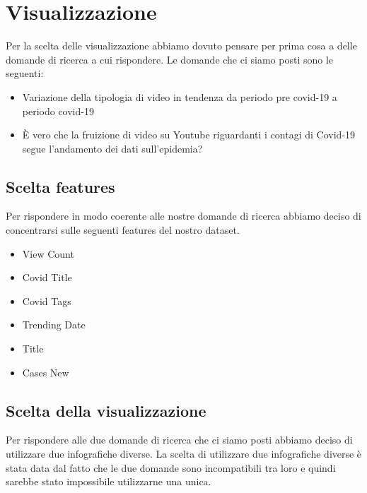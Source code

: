 \documentclass[10pt, a4paper,openany]{article}
\begin{document}
\section*{Visualizzazione}
Per la scelta delle visualizzazione abbiamo dovuto pensare per prima cosa a delle domande di ricerca a cui rispondere. Le domande che ci siamo posti sono le seguenti:
\begin{itemize}
	\item Variazione della tipologia di video in tendenza da periodo pre covid-19 a periodo covid-19
	\item È vero che la fruizione di video su Youtube riguardanti i contagi di Covid-19 segue l'andamento dei dati sull'epidemia?
\end{itemize}

\subsection*{Scelta features}
Per rispondere in modo coerente alle nostre domande di ricerca abbiamo deciso di concentrarsi sulle seguenti features del nostro dataset.
\begin{itemize}
	\item View Count
	\item Covid Title
	\item Covid Tags
	\item Trending Date
	\item Title
	\item Cases New
\end{itemize}

\subsection*{Scelta della visualizzazione}

Per rispondere alle due domande di ricerca che ci siamo posti abbiamo deciso di utilizzare due infografiche diverse. La scelta di utilizzare due infografiche diverse è stata data dal fatto che le due domande sono incompatibili tra loro e quindi sarebbe stato impossibile utilizzarne una unica.
\end{document}
